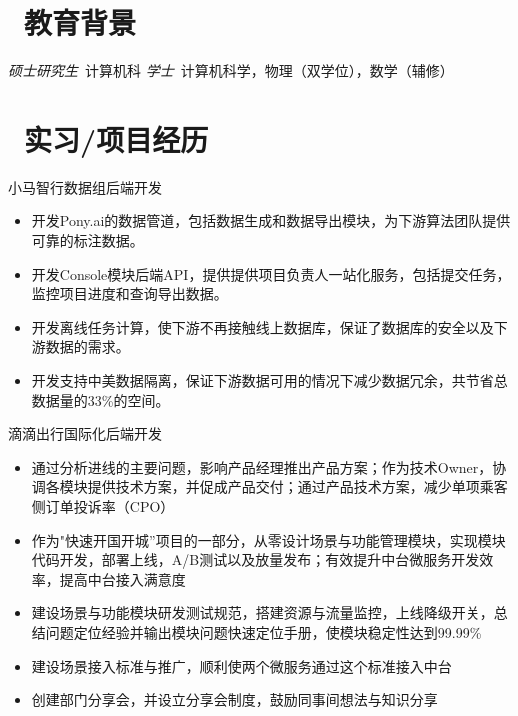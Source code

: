 \documentclass{resume}
\begin{document}


 
\section{\faGraduationCap\  教育背景}
\textit{硕士研究生}\ 计算机科
\textit{学士}\ 计算机科学，物理（双学位），数学（辅修）

\section{\faUsers\ 实习/项目经历}
\role{软件开发工程师}{工作经历}
小马智行数据组后端开发
\begin{itemize}
  \item 开发Pony.ai的数据管道，包括数据生成和数据导出模块，为下游算法团队提供可靠的标注数据。
  \item 开发Console模块后端API，提供提供项目负责人一站化服务，包括提交任务，监控项目进度和查询导出数据。
  \item 开发离线任务计算，使下游不再接触线上数据库，保证了数据库的安全以及下游数据的需求。
  \item 开发支持中美数据隔离，保证下游数据可用的情况下减少数据冗余，共节省总数据量的33\%的空间。
\end{itemize}

滴滴出行国际化后端开发
\begin{itemize}
  \item 通过分析进线的主要问题，影响产品经理推出产品方案；作为技术Owner，协调各模块提供技术方案，并促成产品交付；通过产品技术方案，减少单项乘客侧订单投诉率（CPO）
  \item 作为"快速开国开城”项目的一部分，从零设计场景与功能管理模块，实现模块代码开发，部署上线，A/B测试以及放量发布；有效提升中台微服务开发效率，提高中台接入满意度
  \item 建设场景与功能模块研发测试规范，搭建资源与流量监控，上线降级开关，总结问题定位经验并输出模块问题快速定位手册，使模块稳定性达到99.99\%
  \item 建设场景接入标准与推广，顺利使两个微服务通过这个标准接入中台
  \item 创建部门分享会，并设立分享会制度，鼓励同事间想法与知识分享
\end{itemize}
\end{document}
